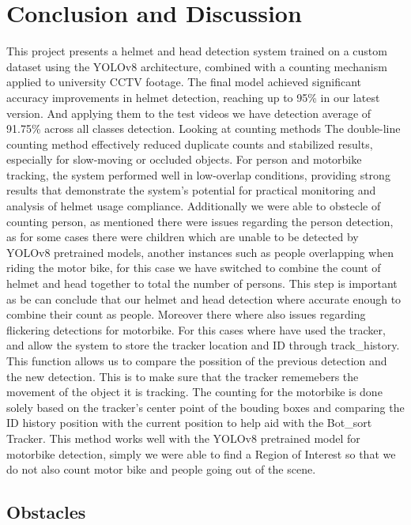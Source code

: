 \chapter{Conclusion and Discussion}
\setlength{\parindent}{2.5em}
This project presents a helmet and head detection system trained on a custom dataset using the YOLOv8 architecture, combined with a counting mechanism applied to university CCTV footage. The final model achieved significant accuracy improvements in helmet detection, reaching up to 95\% in our latest version. And applying them to the test videos we have detection average of 91.75\% across all classes detection. Looking at counting methods The double-line counting method effectively reduced duplicate counts and stabilized results, especially for slow-moving or occluded objects. For person and motorbike tracking, the system performed well in low-overlap conditions, providing strong results that demonstrate the system’s potential for practical monitoring and analysis of helmet usage compliance. Additionally we were able to obstecle of counting person, as mentioned there were issues regarding the person detection, as for some cases there were children which are unable to be detected by YOLOv8 pretrained models, another instances such as people overlapping when riding the motor bike, for this case we have switched to combine the count of helmet and head together to total the number of persons. This step is important as be can conclude that our helmet and head detection where accurate enough to combine their count as people. Moreover there where also issues regarding flickering detections for motorbike. For this cases where have used the tracker, and allow the system to store the tracker location and ID through track\_history. This function allows us to compare the possition of the previous detection and the new detection. This is to make sure that the tracker rememebers the movement of the object it is tracking. The counting for the motorbike is done solely based on the tracker's center point of the bouding boxes and comparing the ID history position with the current position to help aid with the Bot\_sort Tracker. This method works well with the YOLOv8 pretrained model for motorbike detection, simply we were able to find a Region of Interest so that we do not also count motor bike and people going out of the scene. 


\section{Obstacles}

